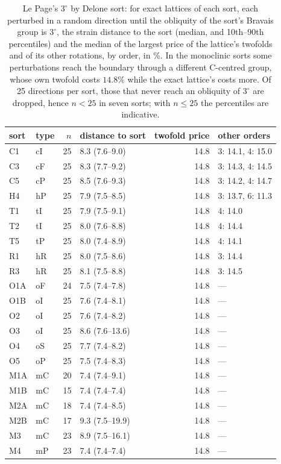 \documentclass[preprint,pdf]{iucr}          %
\begin{document}
\begin{table}
\caption{Le Page's $3^\circ$ by Delone sort: for exact lattices of each sort, each perturbed in a random direction until the obliquity of the sort's Bravais group is $3^\circ$, the strain distance to the sort (median, and 10th--90th percentiles) and the median of the largest price of the lattice's twofolds and of its other rotations, by order, in \%. In the monoclinic sorts some perturbations reach the boundary through a different C-centred group, whose own twofold costs $14.8\%$ while the exact lattice's costs more. Of 25 directions per sort, those that never reach an obliquity of $3^\circ$ are dropped, hence $n<25$ in seven sorts; with $n\le25$ the percentiles are indicative.}
\label{tab:lepage}
\begin{footnotesize}
\begin{tabular}{llrlrl}
\toprule
sort & type & $n$ & distance to sort & twofold price & other orders \\
\midrule
C1 & cI & 25 & 8.3 (7.6--9.0) & 14.8 & 3: 14.1, 4: 15.0 \\
C3 & cF & 25 & 8.3 (7.7--9.2) & 14.8 & 3: 14.3, 4: 14.5 \\
C5 & cP & 25 & 8.5 (7.6--9.3) & 14.8 & 3: 14.2, 4: 14.7 \\
H4 & hP & 25 & 7.9 (7.5--8.5) & 14.8 & 3: 13.7, 6: 11.3 \\
T1 & tI & 25 & 7.9 (7.5--9.1) & 14.8 & 4: 14.0 \\
T2 & tI & 25 & 8.0 (7.6--8.8) & 14.8 & 4: 14.4 \\
T5 & tP & 25 & 8.0 (7.4--8.9) & 14.8 & 4: 14.1 \\
R1 & hR & 25 & 8.0 (7.5--8.6) & 14.8 & 3: 14.4 \\
R3 & hR & 25 & 8.1 (7.5--8.8) & 14.8 & 3: 14.5 \\
O1A & oF & 24 & 7.5 (7.4--7.8) & 14.8 & --- \\
O1B & oI & 25 & 7.6 (7.4--8.1) & 14.8 & --- \\
O2 & oI & 25 & 7.6 (7.4--8.2) & 14.8 & --- \\
O3 & oI & 25 & 8.6 (7.6--13.6) & 14.8 & --- \\
O4 & oS & 25 & 7.7 (7.4--8.2) & 14.8 & --- \\
O5 & oP & 25 & 7.5 (7.4--8.3) & 14.8 & --- \\
M1A & mC & 20 & 7.4 (7.4--9.1) & 14.8 & --- \\
M1B & mC & 15 & 7.4 (7.4--7.4) & 14.8 & --- \\
M2A & mC & 18 & 7.4 (7.4--8.5) & 14.8 & --- \\
M2B & mC & 17 & 9.3 (7.5--19.9) & 14.8 & --- \\
M3 & mC & 23 & 8.9 (7.5--16.1) & 14.8 & --- \\
M4 & mP & 23 & 7.4 (7.4--7.4) & 14.8 & --- \\
\bottomrule
\end{tabular}
\end{footnotesize}
\end{table}
\end{document}
